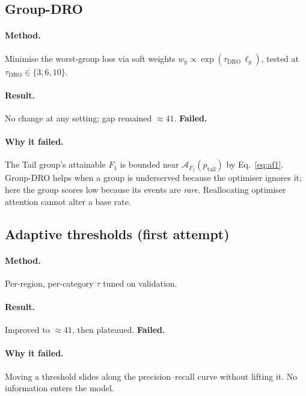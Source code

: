\documentclass[11pt,a4paper]{article}
\newcommand{\A}{\mathcal{A}}
\newcommand{\verdictbad}[1]{\textcolor{dkred}{\textbf{#1}}}
\begin{document}
\subsection{Group-DRO}
\paragraph{Method.} Minimise the worst-group loss via soft weights
$w_g \propto \exp(\tau_{\mathrm{DRO}}\,\ell_g)$, tested at
$\tau_{\mathrm{DRO}} \in \{3, 6, 10\}$.
\paragraph{Result.} No change at any setting; gap remained $\approx 41$.
\verdictbad{Failed.}
\paragraph{Why it failed.} The Tail group's attainable $F_1$ is bounded near
$\A_{F_1}(p_{\text{tail}})$ by Eq.~\eqref{eq:af1}. Group-DRO helps when a group
is underserved because the optimiser ignores it; here the group scores low
because its events are \emph{rare}. Reallocating optimiser attention cannot
alter a base rate.

\subsection{Adaptive thresholds (first attempt)}
\paragraph{Method.} Per-region, per-category $\tau$ tuned on validation.
\paragraph{Result.} Improved to $\approx 41$, then plateaued. \verdictbad{Failed.}
\paragraph{Why it failed.} Moving a threshold slides along the precision--recall
curve without lifting it. No information enters the model.
\medskip

\noindent{}
\end{document}
